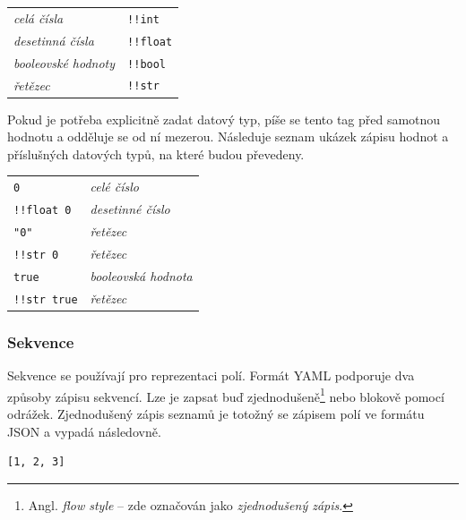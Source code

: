 \documentclass[FM,bw,DP]{tulthesis}
\begin{document}
\vspace{0.5cm}
\begin{tabular}{m{5cm}@{}l}
\textit{celá čísla}\dotfill & \texttt{!!int} \\
\textit{desetinná čísla}\dotfill & \texttt{!!float}  \\
\textit{booleovské hodnoty}\dotfill & \texttt{!!bool}\\
\textit{řetězec}\dotfill & \texttt{!!str} \\
\end{tabular}
\vspace{0.5cm}

Pokud je potřeba explicitně zadat datový typ, píše se tento tag před samotnou hodnotu a odděluje se od ní mezerou. Následuje seznam ukázek zápisu hodnot a příslušných datových typů, na které budou převedeny.

\setlength\LTleft\parindent
\begin{longtable}{m{5cm}@{}l}
\texttt{0}\dotfill & \textit{celé číslo} \\
\texttt{!!float 0}\dotfill & \textit{desetinné číslo} \\
\texttt{"0"}\dotfill & \textit{řetězec} \\
\texttt{!!str 0}\dotfill & \textit{řetězec} \\
\texttt{true}\dotfill & \textit{booleovská hodnota} \\
\texttt{!!str true}\dotfill & \textit{řetězec} \\
\end{longtable}

\subsubsection*{Sekvence}

Sekvence se používají pro reprezentaci polí. Formát YAML podporuje dva způsoby zápisu sekvencí. Lze je zapsat buď zjednodušeně\footnote{Angl. \textit{flow style} -- zde označován jako \textit{zjednodušený zápis}.} nebo blokově pomocí odrážek. Zjednodušený zápis seznamů je totožný se zápisem polí ve formátu JSON a vypadá následovně.

\lstset{style=short}

\vspace{5pt}
\begin{lstlisting}
[1, 2, 3]
\end{lstlisting}
\vspace*{-20pt}
\end{document}
